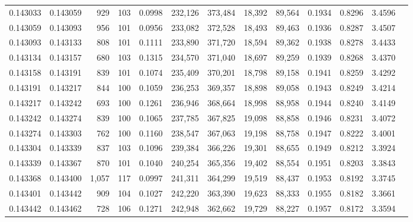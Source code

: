\begin{tabular}{rrrrrrrrrrrrr}
0.143033 & 0.143059 &   929 & 103 &                                     0.0998 & 232,126 & 373,484 &  18,392 &  89,564 & 0.1934 & 0.8296 & 3.4596 \\
0.143059 & 0.143093 &   956 & 101 &                                     0.0956 & 233,082 & 372,528 &  18,493 &  89,463 & 0.1936 & 0.8287 & 3.4507 \\
0.143093 & 0.143133 &   808 & 101 &                                     0.1111 & 233,890 & 371,720 &  18,594 &  89,362 & 0.1938 & 0.8278 & 3.4433 \\
0.143134 & 0.143157 &   680 & 103 &                                     0.1315 & 234,570 & 371,040 &  18,697 &  89,259 & 0.1939 & 0.8268 & 3.4370 \\
0.143158 & 0.143191 &   839 & 101 &                                     0.1074 & 235,409 & 370,201 &  18,798 &  89,158 & 0.1941 & 0.8259 & 3.4292 \\
0.143191 & 0.143217 &   844 & 100 &                                     0.1059 & 236,253 & 369,357 &  18,898 &  89,058 & 0.1943 & 0.8249 & 3.4214 \\
0.143217 & 0.143242 &   693 & 100 &                                     0.1261 & 236,946 & 368,664 &  18,998 &  88,958 & 0.1944 & 0.8240 & 3.4149 \\
0.143242 & 0.143274 &   839 & 100 &                                     0.1065 & 237,785 & 367,825 &  19,098 &  88,858 & 0.1946 & 0.8231 & 3.4072 \\
0.143274 & 0.143303 &   762 & 100 &                                     0.1160 & 238,547 & 367,063 &  19,198 &  88,758 & 0.1947 & 0.8222 & 3.4001 \\
0.143304 & 0.143339 &   837 & 103 &                                     0.1096 & 239,384 & 366,226 &  19,301 &  88,655 & 0.1949 & 0.8212 & 3.3924 \\
0.143339 & 0.143367 &   870 & 101 &                                     0.1040 & 240,254 & 365,356 &  19,402 &  88,554 & 0.1951 & 0.8203 & 3.3843 \\
0.143368 & 0.143400 & 1,057 & 117 &                                     0.0997 & 241,311 & 364,299 &  19,519 &  88,437 & 0.1953 & 0.8192 & 3.3745 \\
0.143401 & 0.143442 &   909 & 104 &                                     0.1027 & 242,220 & 363,390 &  19,623 &  88,333 & 0.1955 & 0.8182 & 3.3661 \\
0.143442 & 0.143462 &   728 & 106 &                                     0.1271 & 242,948 & 362,662 &  19,729 &  88,227 & 0.1957 & 0.8172 & 3.3594 \\

\end{tabular}
